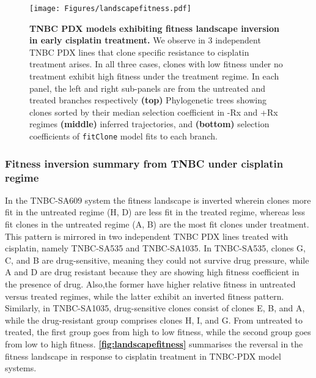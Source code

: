 \begin{figure}
\centering
\texttt{[image: Figures/landscapefitness.pdf]}
	
\caption[Fitness landscape reversal in early cisplatin treatment in TNBC PDX models.]
	{\small
	\textbf{TNBC PDX models exhibiting fitness landscape inversion in early cisplatin treatment.}
	     We observe in 3 independent TNBC PDX lines that clone specific resistance to cisplatin treatment arises. In all three cases, clones with low fitness under no treatment exhibit high fitness under the treatment regime. In each panel, the left and right sub-panels are from the untreated and treated branches respectively \textbf{(top)} Phylogenetic trees showing clones sorted by their median selection coefficient in -Rx and +Rx regimes  \textbf{(middle)} inferred trajectories, and  \textbf{(bottom)} selection coefficients of \texttt{fitClone} model fits to each branch.
	}
	\label{fig:landscapefitness}
\end{figure}


\subsubsection{Fitness inversion summary from TNBC under cisplatin regime }
In the TNBC-SA609 system the fitness landscape is inverted wherein
clones more fit in the untreated regime (H, D) are less fit in the treated regime, whereas less fit clones in the untreated regime (A, B) are the most fit clones under treatment. This pattern is
mirrored in two independent TNBC PDX lines treated with cisplatin, namely TNBC-SA535 and TNBC-SA1035. In TNBC-SA535, clones G, C, and B are drug-sensitive, meaning they could not survive drug pressure, while A and D are drug resistant because they are showing high fitness coefficient in the presence of drug. Also,the former have higher relative fitness in untreated versus treated regimes, while the latter exhibit an inverted fitness pattern. Similarly, in TNBC-SA1035, drug-sensitive clones consist of clones E, B, and A, while the drug-resistant group comprises clones H, I, and G. From untreated
to treated, the first group goes from high to low fitness, while the second group goes from low to high fitness. \textbf{\autoref{fig:landscapefitness}} summarises the reversal in the fitness landscape in response to cisplatin treatment in TNBC-PDX model systems.



